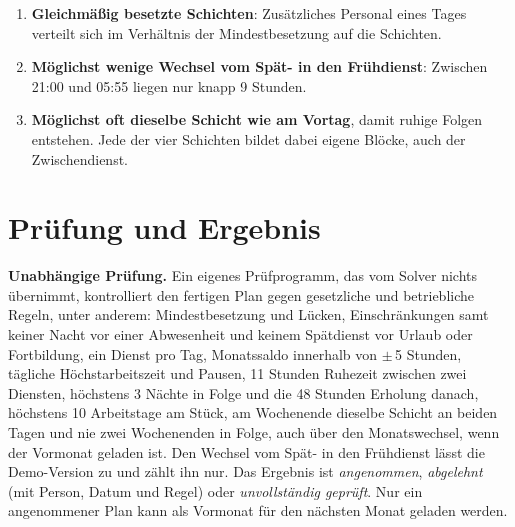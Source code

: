 \documentclass[11pt]{combiArticle}
\begin{document}
\begin{enumerate}
        arbeiten kann (mit der Vorgabe: Fachkräfte Früh, Spät und Nacht, Azubis Früh und Spät).
        Ein Zwischendienst zählt dabei als Frühdienst. Mit Vormonat reichen diese Zeiträume in den Vormonat zurück; was
        dort schon gearbeitet wurde, zählt mit.
  \item \textbf{Gleichmäßig besetzte Schichten}: Zusätzliches Personal eines Tages verteilt sich im Verhältnis
        der Mindestbesetzung auf die Schichten.
  \item \textbf{Möglichst wenige Wechsel vom Spät- in den Frühdienst}: Zwischen 21:00 und 05:55 liegen nur knapp
        9 Stunden.
  \item \textbf{Möglichst oft dieselbe Schicht wie am Vortag}, damit ruhige Folgen entstehen. Jede der vier
        Schichten bildet dabei eigene Blöcke, auch der Zwischendienst.
\end{enumerate}

\section{Prüfung und Ergebnis}\label{sec:ergebnis}

\textbf{Unabhängige Prüfung.} Ein eigenes Prüfprogramm, das vom Solver nichts übernimmt, kontrolliert den
fertigen Plan gegen gesetzliche und betriebliche Regeln, unter anderem: Mindestbesetzung und Lücken,
Einschränkungen samt keiner Nacht vor einer Abwesenheit und keinem Spätdienst vor Urlaub oder Fortbildung, ein
Dienst pro Tag, Monatssaldo innerhalb von $\pm$\,5 Stunden, tägliche Höchstarbeitszeit und
Pausen, 11 Stunden Ruhezeit zwischen zwei Diensten, höchstens 3 Nächte in Folge und die 48 Stunden Erholung
danach, höchstens 10 Arbeitstage am Stück, am Wochenende dieselbe Schicht an beiden Tagen und nie zwei Wochenenden
in Folge, auch über den Monatswechsel, wenn der Vormonat geladen ist. Den Wechsel vom Spät- in den Frühdienst lässt
die Demo-Version zu und zählt ihn nur. Das Ergebnis ist \emph{angenommen},
\emph{abgelehnt} (mit Person, Datum und Regel) oder \emph{unvollständig geprüft}. Nur ein angenommener Plan kann
als Vormonat für den nächsten Monat geladen werden.
\end{document}
